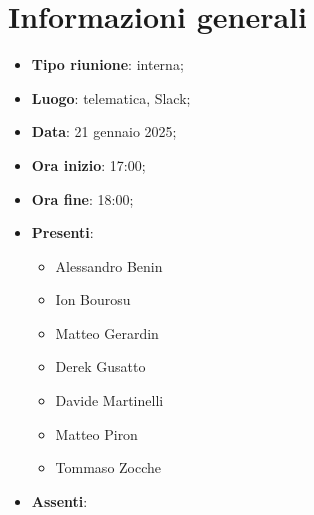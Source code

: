 \section{Informazioni generali}
\begin{itemize}
  \item \textbf{Tipo riunione}: interna;
  \item \textbf{Luogo}: telematica, Slack;
  \item \textbf{Data}: 21 gennaio 2025;
  \item \textbf{Ora inizio}: 17:00;
  \item \textbf{Ora fine}: 18:00;
  
  \item \textbf{Presenti}:
  \begin{itemize}
    \item Alessandro Benin
    \item Ion Bourosu
    \item Matteo Gerardin
    \item Derek Gusatto
    \item Davide Martinelli
    \item Matteo Piron
    \item Tommaso Zocche
  \end{itemize}

  \item \textbf{Assenti}:
 
\end{itemize}